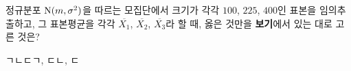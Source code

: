 정규분포 $\mathrm{N}(m{,}\mkern3mu\mathopen{}\sigma^2)$을 따르는 모집단에서 크기가 각각 $100$, $225$, $400$인 표본을 임의추출하고, 그 표본평균을 각각 $\overline{X_1}$, $\overline{X_2}$, $\overline{X_3}$라 할 때, 옳은 것만을 \textbf{보기}에서 있는 대로 고른 것은? 
\begin{choices32}{ㄱ}{ㄴ}{ㄷ}{ㄱ, ㄷ}{ㄴ, ㄷ}\end{choices32}
